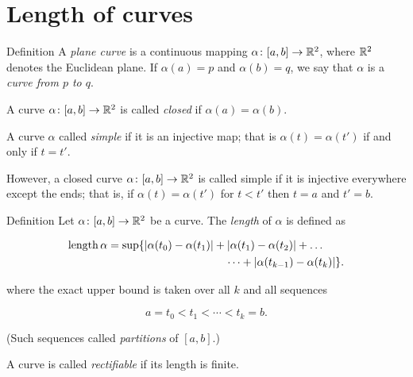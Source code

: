 

\chapter{Length of curves}



\begin{thm}{Definition}\label{def:curve}
A \emph{plane curve} is a continuous mapping $\alpha\:[a,b]\z\to \RR^2$,
where $\mathbb{R}^2$ denotes the Euclidean plane. 
If $\alpha(a)=p$ and $\alpha(b)=q$,
we say that $\alpha$ is a \emph{curve from $p$ to $q$}.



A curve $\alpha\colon[a,b]\to \mathbb{R}^2$ is called \emph{closed} if $\alpha(a)=\alpha(b)$.

A curve $\alpha$ called \emph{simple} if it is an injective map;
that is $\alpha(t)=\alpha(t')$ if and only if $t=t'$.

However, a closed curve $\alpha\colon[a,b]\to \mathbb{R}^2$ is called simple if it is injective 
everywhere except the ends; that is, if
$\alpha(t)=\alpha(t')$ for $t<t'$ then $t=a$ and $t'=b$.

\end{thm}

 





\begin{thm}{Definition}\label{def:length}
Let $\alpha\colon[a,b]\to \mathbb{R}^2$ be a curve.
The \emph{length} of $\alpha$ is defined as

\begin{align*}
\length \alpha
&= 
\sup \{|\alpha(t_0)-\alpha(t_1)|+|\alpha(t_1)-\alpha(t_2)|+\dots
\\
&\ \ \ \ \ \ \ \ \ \ \ \ \ \ \ \ \ \ \ \ \ \ \ \ \ \ \ \ \ \ \ \ \dots+|\alpha(t_{k-1})-\alpha(t_k)|\}. 
\end{align*}

where the exact upper bound is taken over all $k$ and all sequences

\[a=t_0 < t_1 < \cdots < t_k=b.\]

(Such sequences called \emph{partitions} of $[a,b]$.)



A curve is called \emph{rectifiable} if its length is finite.

\end{thm}



